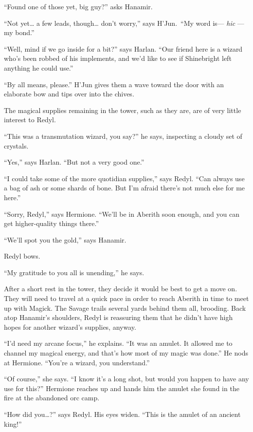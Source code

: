 \documentclass[smalldemyvopaper,11pt,twoside,onecolumn,openright,extrafontsizes]{memoir}
\begin{document}
``Found one of those yet, big guy?'' asks Hanamir.

``Not yet\ldots{} a few leads, though\ldots{} don't worry,'' says
H'Jun.~``My word is--- \emph{hic} ---my bond.''

``Well, mind if we go inside for a bit?'' says Harlan. ``Our friend here
is a wizard who's been robbed of his implements, and we'd like to see if
Shinebright left anything he could use.''

``By all means, please.'' H'Jun gives them a wave toward the door with
an elaborate bow and tips over into the chives.

The magical supplies remaining in the tower, such as they are, are of
very little interest to Redyl.

``This was a transmutation wizard, you say?'' he says, inspecting a
cloudy set of crystals.

``Yes,'' says Harlan. ``But not a very good one.''

``I could take some of the more quotidian supplies,'' says Redyl. ``Can
always use a bag of ash or some shards of bone. But I'm afraid there's
not much else for me here.''

``Sorry, Redyl,'' says Hermione. ``We'll be in Aberith soon enough, and
you can get higher-quality things there.''

``We'll spot you the gold,'' says Hanamir.

Redyl bows.

``My gratitude to you all is unending,'' he says.

After a short rest in the tower, they decide it would be best to get a
move on. They will need to travel at a quick pace in order to reach
Aberith in time to meet up with Magick. The Savage trails several yards
behind them all, brooding. Back atop Hanamir's shoulders, Redyl is
reassuring them that he didn't have high hopes for another wizard's
supplies, anyway.

``I'd need my arcane focus,'' he explains. ``It was an amulet. It
allowed me to channel my magical energy, and that's how most of my magic
was done.'' He nods at Hermione. ``You're a wizard, you understand.''

``Of course,'' she says. ``I know it's a long shot, but would you happen
to have any use for this?'' Hermione reaches up and hands him the amulet
she found in the fire at the abandoned orc camp.

``How did you\ldots?'' says Redyl. His eyes widen. ``This is the amulet
of an ancient king!''
\end{document}
